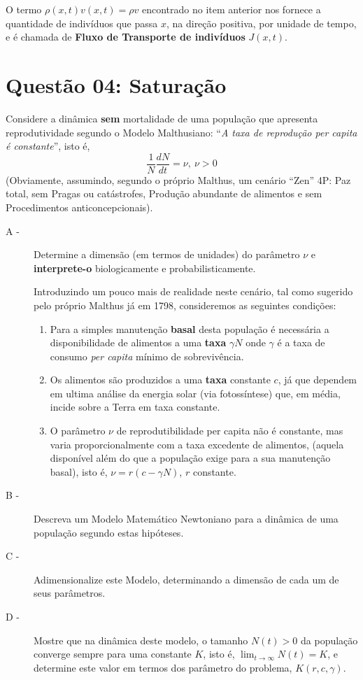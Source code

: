 O termo $\rho(x,t) v(x,t) = \rho v$ encontrado no item anterior nos fornece a quantidade de indivíduos que passa $x$, na direção positiva, por unidade de tempo, e é chamada de \textbf{Fluxo de Transporte de indivíduos} $J(x,t)$.








\clearpage
\chapter*{Questão 04: Saturação}

Considere a dinâmica \textbf{sem} mortalidade de uma população que apresenta reprodutividade segundo o Modelo Malthusiano: ``\textit{A taxa de reprodução per capita é constante}'', isto é,
\[\dfrac{1}{N}\dfrac{dN}{dt} = \nu,\ \nu > 0\]
(Obviamente, assumindo, segundo o próprio Malthus, um cenário ``Zen'' 4P: Paz total, sem Pragas ou catástrofes, Produção abundante de alimentos e sem Procedimentos anticoncepcionais).


\begin{description}
\item[A -] Determine a dimensão (em termos de unidades) do parâmetro \(\nu\) e \textbf{interprete-o} biologicamente e probabilisticamente.

Introduzindo um pouco mais de realidade neste cenário, tal como sugerido pelo próprio Malthus já em 1798, consideremos as seguintes condições:

\begin{enumerate}
\item Para a simples manutenção \textbf{basal} desta população é necessária a disponibilidade de alimentos a uma \textbf{taxa} \(\gamma N\) onde \(\gamma\) é a taxa de consumo \textit{per capita} mínimo de sobrevivência.
\item Os alimentos são produzidos a uma \textbf{taxa} constante \(c\), já que dependem em ultima análise da energia solar (via fotossíntese) que, em média, incide sobre a Terra em taxa constante.
\item O parâmetro \(\nu\) de reprodutibilidade per capita não é constante, mas varia proporcionalmente com a taxa excedente de alimentos, (aquela disponível além do que a população exige para a sua manutenção basal), isto é, \(\nu = r (c - \gamma N)\), \(r\) constante.
\end{enumerate}

\item[B -] Descreva um Modelo Matemático Newtoniano para a dinâmica de uma população segundo estas hipóteses.

\item[C -] Adimensionalize este Modelo, determinando a dimensão de cada um de seus parâmetros.

\item[D -] Mostre que na dinâmica deste modelo, o tamanho \(N(t) > 0\) da população converge sempre para uma constante \(K\), isto é, \(\displaystyle\lim_{t\to \infty} N(t) = K\), e determine este valor em termos dos parâmetro do problema, \(K(r, c, \gamma)\).
\end{description}

